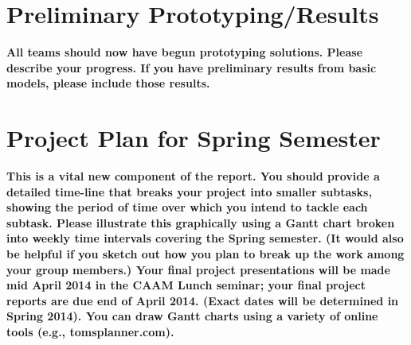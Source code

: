 \documentclass [11pt ]{ report}
\renewcommand{\b}{\textbf}
\begin{document}
\section{Preliminary Prototyping/Results}
\b{All teams should now have begun prototyping solutions.
Please describe your progress. If you have preliminary results from basic models, please
include those results.}

\section{Project Plan for Spring Semester}
\b{This is a vital new component of the report. You should
provide a detailed time-line that breaks your project into smaller subtasks, showing the period
of time over which you intend to tackle each subtask. Please illustrate this graphically
using a Gantt chart broken into weekly time intervals covering the Spring semester. (It would
also be helpful if you sketch out how you plan to break up the work among your group members.)
Your final project presentations will be made mid April 2014 in the CAAM Lunch seminar;
your final project reports are due end of April 2014. (Exact dates will be determined in
Spring 2014).
You can draw Gantt charts using a variety of online tools (e.g., tomsplanner.com).}
\end{document}

